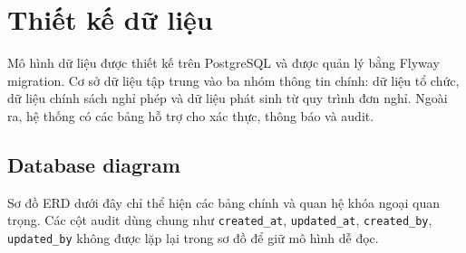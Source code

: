 \section{Thiết kế dữ liệu}
Mô hình dữ liệu được thiết kế trên PostgreSQL và được quản lý bằng Flyway migration. Cơ sở dữ liệu tập trung vào ba nhóm thông tin chính: dữ liệu tổ chức, dữ liệu chính sách nghỉ phép và dữ liệu phát sinh từ quy trình đơn nghỉ. Ngoài ra, hệ thống có các bảng hỗ trợ cho xác thực, thông báo và audit.

\subsection{Database diagram}
Sơ đồ ERD dưới đây chỉ thể hiện các bảng chính và quan hệ khóa ngoại quan trọng. Các cột audit dùng chung như \texttt{created\_at}, \texttt{updated\_at}, \texttt{created\_by}, \texttt{updated\_by} không được lặp lại trong sơ đồ để giữ mô hình dễ đọc.

